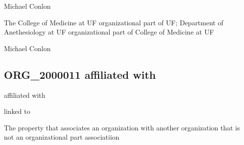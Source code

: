 \documentclass[letterpaper,10pt,english]{sphinxmanual}
\begin{document}
\begin{sphinxShadowBox}

\sphinxAtStartPar
Michael Conlon 
\end{sphinxShadowBox}

\begin{sphinxShadowBox}

\sphinxAtStartPar
The College of Medicine at UF organizational part of UF; Department of Anethesiology at UF organizational part of College of Medicine at UF
\end{sphinxShadowBox}

\begin{sphinxShadowBox}

\sphinxAtStartPar
Michael Conlon 
\end{sphinxShadowBox}
\begin{quote}

\ignorespaces \end{quote}


\subsection{ORG\_2000011 \sphinxhyphen{} affiliated with}
\label{\detokenize{doc-ORG_2000011:org-2000011-affiliated-with}}\label{\detokenize{doc-ORG_2000011:index-0}}\label{\detokenize{doc-ORG_2000011::doc}}
\begin{sphinxShadowBox}

\sphinxAtStartPar
affiliated with
\end{sphinxShadowBox}

\begin{sphinxShadowBox}

\sphinxAtStartPar
linked to
\end{sphinxShadowBox}

\begin{sphinxShadowBox}

\sphinxAtStartPar
The property that associates an organization with another organization that is not an organizational part associatiion
\end{sphinxShadowBox}
\end{document}
